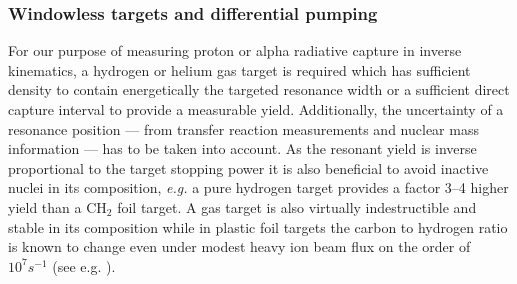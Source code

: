 \subsubsection{Windowless targets and differential pumping}


For our purpose of measuring proton or alpha radiative capture in inverse kinematics, a hydrogen or helium gas target is required which has sufficient density  to contain energetically the targeted resonance width or a sufficient direct capture interval to provide a measurable yield. Additionally, the uncertainty of a resonance position --- from transfer reaction measurements and nuclear mass information --- has to be taken into account. As the resonant yield is inverse proportional to the target stopping power it is also beneficial to avoid inactive nuclei in its composition, {\it e.g.} a pure hydrogen target provides a factor 3--4 higher yield than a CH$_2$ foil target.  A gas target is also virtually indestructible and stable in its composition while in plastic foil targets the carbon to hydrogen ratio is known to change even under modest heavy ion beam flux on the order of $10^7 \unit{s^{-1}}$ (see e.g. \cite{rui05}).


